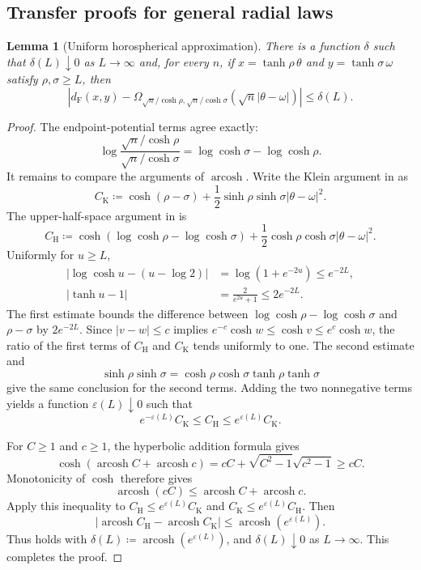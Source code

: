 \documentclass{amsart}
\numberwithin{equation}{section}
\theoremstyle{plain}
\newtheorem{lemma}[theorem]{Lemma}
\theoremstyle{definition}
\theoremstyle{remark}
\DeclareMathOperator{\arcosh}{arcosh}
\newcommand{\dF}{d_{\mathrm F}}
\begin{document}
\subsection{Transfer proofs for general radial laws}\label{app:general-transfer-proofs}

\begin{lemma}[Uniform horospherical approximation]
\label{lem:general-horospherical-approximation}
There is a function $\delta$ such that $\delta(L)\downarrow0$ as $L\to\infty$ and, for every $n$, if
$x=\tanh\rho\,\theta$ and $y=\tanh\sigma\,\omega$ satisfy $\rho,\sigma\ge L$, then
\begin{equation}\label{eq:general-horospherical-approximation}
 \left|
 \dF(x,y)-
 \Omega_{\sqrt n/\cosh\rho,\sqrt n/\cosh\sigma}
        (\sqrt n|\theta-\omega|)
 \right|
 \le\delta(L).
\end{equation}
\end{lemma}

\begin{proof}
The endpoint-potential terms agree exactly:
\[
 \log\frac{\sqrt n/\cosh\rho}{\sqrt n/\cosh\sigma}
 =\log\cosh\sigma-\log\cosh\rho.
\]
It remains to compare the arguments of $\arcosh$.  Write the Klein argument in  as
\[
 C_{\mathrm K}
 \coloneqq\cosh(\rho-\sigma)
  +\frac12\sinh\rho\sinh\sigma|\theta-\omega|^2.
\]
The upper-half-space argument in  is
\[
 C_{\mathrm H}
 \coloneqq\cosh(\log\cosh\rho-\log\cosh\sigma)
  +\frac12\cosh\rho\cosh\sigma|\theta-\omega|^2.
\]
Uniformly for $u\ge L$,
\[
 \begin{aligned}
 \left|\log\cosh u-(u-\log2)\right|
 &=\log(1+e^{-2u})\le e^{-2L},\\
 |\tanh u-1|&=\frac{2}{e^{2u}+1}\le2e^{-2L}.
 \end{aligned}
\]
The first estimate bounds the difference between $\log\cosh\rho-\log\cosh\sigma$ and $\rho-\sigma$ by $2e^{-2L}$.
Since $|v-w|\le c$ implies $e^{-c}\cosh w\le\cosh v\le e^c\cosh w$, the ratio of the first terms of
$C_{\mathrm H}$ and $C_{\mathrm K}$ tends uniformly to one.  The second estimate and
\[
 \sinh\rho\sinh\sigma
 =\cosh\rho\cosh\sigma\tanh\rho\tanh\sigma
\]
give the same conclusion for the second terms.  Adding the two nonnegative terms yields a function
$\varepsilon(L)\downarrow0$ such that
\[
 e^{-\varepsilon(L)}C_{\mathrm K}
 \le C_{\mathrm H}
 \le e^{\varepsilon(L)}C_{\mathrm K}.
\]

For $C\ge1$ and $c\ge1$, the hyperbolic addition formula gives
\[
 \cosh(\arcosh C+\arcosh c)
 =cC+\sqrt{C^2-1}\sqrt{c^2-1}\ge cC.
\]
Monotonicity of $\cosh$ therefore gives
\[
 \arcosh(cC)\le\arcosh C+\arcosh c.
\]
Apply this inequality to $C_{\mathrm H}\le e^{\varepsilon(L)}C_{\mathrm K}$ and
$C_{\mathrm K}\le e^{\varepsilon(L)}C_{\mathrm H}$.  Then
\[
 |\arcosh C_{\mathrm H}-\arcosh C_{\mathrm K}|
 \le\arcosh(e^{\varepsilon(L)}).
\]
Thus  holds with
$\delta(L)\coloneqq\arcosh(e^{\varepsilon(L)})$, and $\delta(L)\downarrow0$ as $L\to\infty$.
This completes the proof.
\end{proof}
\end{document}
